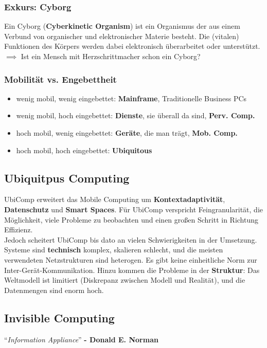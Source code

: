\documentclass[a4paper]{article}
\begin{document}
\subsubsection{Exkurs: Cyborg}
Ein Cyborg (\textbf{Cyberkinetic Organism}) ist ein Organismus der aus einem Verbund von organischer und elektronischer Materie besteht. Die (vitalen) Funktionen des Körpers werden dabei elektronisch überarbeitet oder unterstützt. \\
$\implies$ Ist ein Mensch mit Herzschrittmacher schon ein Cyborg?
\subsubsection{Mobilität vs. Engebettheit}
\begin{itemize}
	\item wenig mobil, wenig eingebettet: \textbf{Mainframe}, Traditionelle Business PCs 
	\item wenig mobil, hoch eingebettet: \textbf{Dienste}, sie überall da sind, \textbf{Perv. Comp. } 
	\item hoch mobil, wenig eingebettet: \textbf{Geräte}, die man trägt, \textbf{Mob. Comp.}
	\item hoch mobil, hoch eingebettet: \textbf{Ubiquitous}
\end{itemize}

\subsection{Ubiquitpus Computing}
UbiComp erweitert das Mobile Computing um \textbf{Kontextadaptivität}, \textbf{Datenschutz} und \textbf{Smart Spaces}. Für UbiComp verspricht Feingranularität, die Möglichkeit, viele Probleme zu beobachten und einen großen Schritt in Richtung Effizienz.\\

Jedoch scheitert UbiComp bis dato an vielen Schwierigkeiten in der Umsetzung. Systeme sind \textbf{technisch} komplex, skalieren schlecht, und die meisten verwendeten Netzstrukturen sind heterogen. Es gibt keine einheitliche Norm zur Inter-Gerät-Kommunikation. Hinzu kommen die Probleme in der \textbf{Struktur}: Das Weltmodell ist limitiert (Diskrepanz zwischen Modell und Realität), und die Datenmengen sind enorm hoch.

\subsection{Invisible Computing}
``\textit{Information Appliance}'' \textbf{- Donald E. Norman}\\
\end{document}
